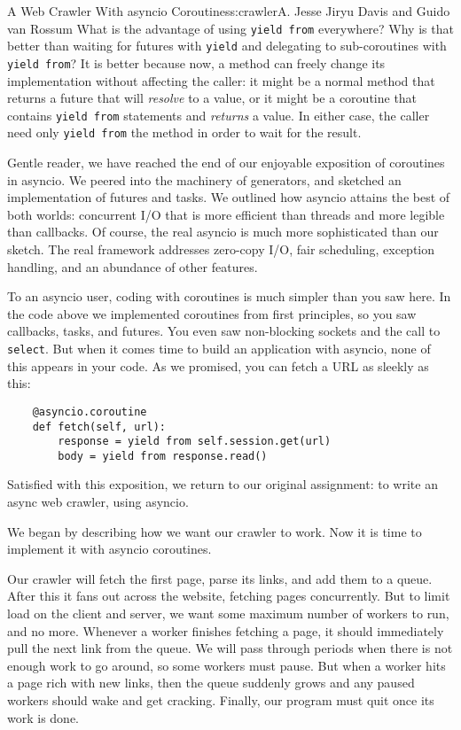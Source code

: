 \begin{aosachapter}{A Web Crawler With asyncio Coroutines}{s:crawler}{A. Jesse Jiryu Davis and Guido van Rossum}
What is the advantage of using \texttt{yield from} everywhere? Why is
that better than waiting for futures with \texttt{yield} and delegating
to sub-coroutines with \texttt{yield from}? It is better because now, a
method can freely change its implementation without affecting the
caller: it might be a normal method that returns a future that will
\emph{resolve} to a value, or it might be a coroutine that contains
\texttt{yield from} statements and \emph{returns} a value. In either
case, the caller need only \texttt{yield from} the method in order to
wait for the result.

Gentle reader, we have reached the end of our enjoyable exposition of
coroutines in asyncio. We peered into the machinery of generators, and
sketched an implementation of futures and tasks. We outlined how asyncio
attains the best of both worlds: concurrent I/O that is more efficient
than threads and more legible than callbacks. Of course, the real
asyncio is much more sophisticated than our sketch. The real framework
addresses zero-copy I/O, fair scheduling, exception handling, and an
abundance of other features.

To an asyncio user, coding with coroutines is much simpler than you saw
here. In the code above we implemented coroutines from first principles,
so you saw callbacks, tasks, and futures. You even saw non-blocking
sockets and the call to \texttt{select}. But when it comes time to build
an application with asyncio, none of this appears in your code. As we
promised, you can fetch a URL as sleekly as this:

\begin{verbatim}
    @asyncio.coroutine
    def fetch(self, url):
        response = yield from self.session.get(url)
        body = yield from response.read()
\end{verbatim}

Satisfied with this exposition, we return to our original assignment: to
write an async web crawler, using asyncio.

\label{coordinating-coroutines}

We began by describing how we want our crawler to work. Now it is time
to implement it with asyncio coroutines.

Our crawler will fetch the first page, parse its links, and add them to
a queue. After this it fans out across the website, fetching pages
concurrently. But to limit load on the client and server, we want some
maximum number of workers to run, and no more. Whenever a worker
finishes fetching a page, it should immediately pull the next link from
the queue. We will pass through periods when there is not enough work to
go around, so some workers must pause. But when a worker hits a page
rich with new links, then the queue suddenly grows and any paused
workers should wake and get cracking. Finally, our program must quit
once its work is done.


\end{aosachapter}
